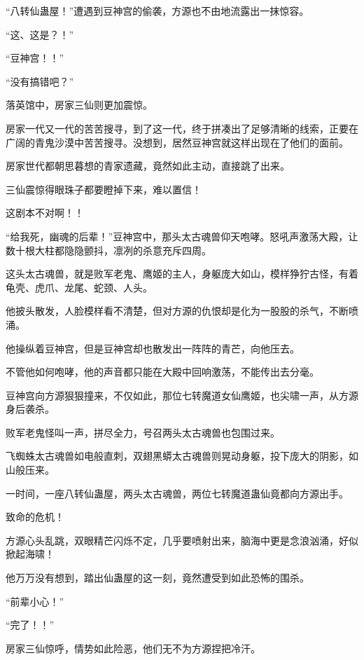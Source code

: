 
\begin{this_body}

“八转仙蛊屋！”遭遇到豆神宫的偷袭，方源也不由地流露出一抹惊容。

“这、这是？！”

“豆神宫！！”

“没有搞错吧？”

落英馆中，房家三仙则更加震惊。

房家一代又一代的苦苦搜寻，到了这一代，终于拼凑出了足够清晰的线索，正要在广阔的青鬼沙漠中苦苦搜寻。没想到，居然豆神宫就这样出现在了他们的面前。

房家世代都朝思暮想的青家遗藏，竟然如此主动，直接跳了出来。

三仙震惊得眼珠子都要瞪掉下来，难以置信！

这剧本不对啊！！

“给我死，幽魂的后辈！”豆神宫中，那头太古魂兽仰天咆哮。怒吼声激荡大殿，让数十根大柱都隐隐颤抖，凛冽的杀意充斥四周。

这头太古魂兽，就是败军老鬼、鹰姬的主人，身躯庞大如山，模样狰狞古怪，有着龟壳、虎爪、龙尾、蛇颈、人头。

他披头散发，人脸模样看不清楚，但对方源的仇恨却是化为一股股的杀气，不断喷涌。

他操纵着豆神宫，但是豆神宫却也散发出一阵阵的青芒，向他压去。

不管他如何咆哮，他的声音都只能在大殿中回响激荡，不能传出去分毫。

豆神宫向方源狠狠撞来，不仅如此，那位七转魔道女仙鹰姬，也尖啸一声，从方源身后袭杀。

败军老鬼怪叫一声，拼尽全力，号召两头太古魂兽也包围过来。

飞蜘蛛太古魂兽如电般直刺，双翅黑蟒太古魂兽则晃动身躯，投下庞大的阴影，如山般压来。

一时间，一座八转仙蛊屋，两头太古魂兽，两位七转魔道蛊仙竟都向方源出手。

致命的危机！

方源心头乱跳，双眼精芒闪烁不定，几乎要喷射出来，脑海中更是念浪汹涌，好似掀起海啸！

他万万没有想到，踏出仙蛊屋的这一刻，竟然遭受到如此恐怖的围杀。

“前辈小心！”

“完了！！”

房家三仙惊呼，情势如此险恶，他们无不为方源捏把冷汗。


\end{this_body}
